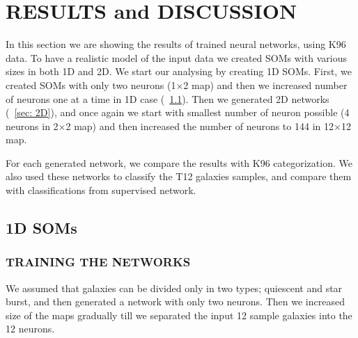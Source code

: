 \section{RESULTS and DISCUSSION}
\label{sec: result}
    In this section we are showing the results of trained neural networks, using K96 data. 
    To have a realistic model of the input data we created SOMs with various sizes in both 1D and 2D.
    We start our analysing by creating 1D SOMs. 
    First, we created SOMs with only two neurons (1$\times$2 map) and then we increased number of neurons one at a time in 1D case (~\ref{sec: 1D}).
    Then we generated 2D networks (~\ref{sec: 2D}), and once again we start with smallest number of neuron possible (4 neurons in 2$\times$2 map) and then increased the number of neurons to 144 in 12$\times$12 map.
    
    For each generated network, we compare the results with K96 categorization.
    We also used these networks to classify the T12 galaxies samples, and compare them with classifications from supervised network.
    \subsection{1D SOMs}
    \label{sec: 1D}
        \subsubsection{TRAINING THE NETWORKS}
        \label{sec: 1Dt}
            We assumed that galaxies can be divided only in two types; quiescent and star burst, and then generated a network with only two neurons.
            Then we increased size of the maps gradually till we separated the input 12 sample galaxies into the 12 neurons. 
        
